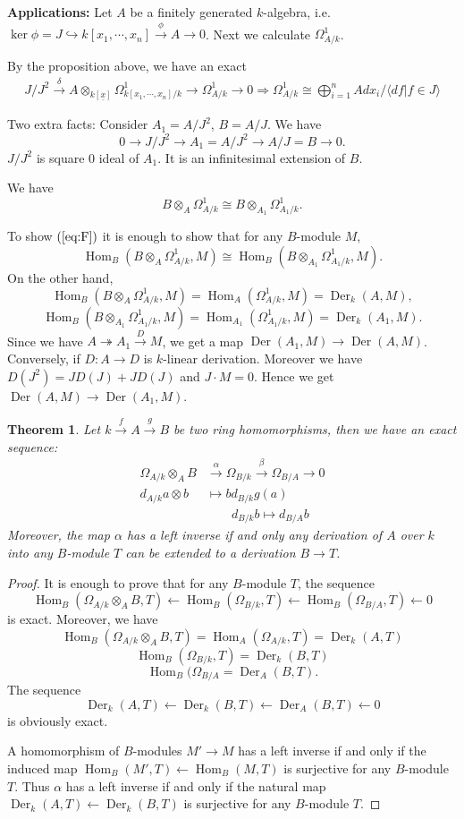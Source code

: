 \documentclass[cs4size]{article}
\newcommand{\la}{\leftarrow}
\newcommand{\ra}{\rightarrow}
\newcommand{\xr}{\xrightarrow}
\newcommand{\Ra}{\Rightarrow}
\DeclareMathOperator{\Der}{Der}
\DeclareMathOperator{\Hom}{Hom}
\newtheorem{thm}{Theorem}
\begin{document}
\textbf{Applications: } Let $A$ be a finitely generated $k$-algebra, i.e. $\ker{\phi}=J\hookrightarrow k[x_1,\cdots,x_n]\xr{\phi}A\ra 0$. Next we calculate $\Omega_{A/k}^1$.

By the proposition above, we have an exact
\begin{align*}
J/J^2\xr{\delta}A\otimes_{k[\underline{x}]}\Omega_{k[x_1,\cdots,x_n]/k}^1\ra\Omega_{A/k}^1\ra0
\Ra \Omega_{A/k}^1\cong \bigoplus_{i=1}^nAdx_i/\langle df|f\in J\rangle
\end{align*}

Two extra facts: Consider $A_1=A/J^2$, $B=A/J$. We have \[0\ra J/J^2\ra A_1=A/J^2\ra A/J=B\ra 0.\] $J/J^2$ is square $0$ ideal of $A_1$. It is an infinitesimal extension of $B$.

We have \begin{equation}
B\otimes _A\Omega_{A/k}^1\cong B\otimes_{A_1}\Omega_{A_1/k}^1.\label{eq:F}
\end{equation}

To show $(\ref{eq:F})$ it is enough to show that for any $B$-module $M$, \[\Hom_B(B\otimes_A\Omega_{A/k}^1,M)\cong \Hom_B(B\otimes_{A_1}\Omega_{A_1/k}^1,M).\] On the other hand, \[\Hom_B(B\otimes_A\Omega_{A/k}^1,M)=\Hom_A(\Omega_{A/k}^1,M)=\Der_k(A,M),\]
\[\Hom_B(B\otimes_{A_1}\Omega_{A_1/k}^1,M)=\Hom_{A_1}(\Omega_{A_1/k}^1,M)=\Der_k(A_1,M).\]
Since we have $A\twoheadrightarrow A_1\xr{D}M$, we get a map $\Der(A_1,M)\ra \Der(A,M)$. Conversely, if $D:A\ra D$ is $k$-linear derivation. Moreover we have $D(J^2)=JD(J)+JD(J)$ and $J\cdot M=0$. Hence we get $\Der(A,M)\ra\Der(A_1,M)$.

\begin{thm}
Let $k\xr{f} A\xr{g} B$ be two ring homomorphisms, then we have an exact sequence:
\begin{align*}
\Omega_{A/k}\otimes_AB&\xr{\alpha}\Omega_{B/k}\xr{\beta}\Omega_{B/A}\ra0\\
d_{A/k}a\otimes b&\mapsto bd_{B/k}g(a)\\
&\qquad d_{B/k}b\mapsto d_{B/A}b
\end{align*}
Moreover, the map $\alpha$ has a left inverse if and only any derivation of $A$ over $k$ into any $B$-module $T$ can be extended to a derivation $B\ra T$.
\end{thm}
\begin{proof}
It is enough to prove that for any $B$-module $T$, the sequence
\[\Hom_B(\Omega_{A/k}\otimes_AB,T)\la\Hom_B(\Omega_{B/k},T)\la\Hom_B(\Omega_{B/A},T)\la0\]
is exact.
Moreover, we have \[\Hom_B(\Omega_{A/k}\otimes_AB,T)=\Hom_A(\Omega_{A/k},T)=\Der_k(A,T)\]
\[\Hom_B(\Omega_{B/k},T)=\Der_k(B,T)\]
\[\Hom_B(\Omega_{B/A}=\Der_A(B,T).\]
The sequence
\[\Der_k(A,T)\la\Der_k(B,T)\la\Der_A(B,T)\la0\]
is obviously exact.

A homomorphism of $B$-modules $M'\ra M$ has a left inverse if and only if the induced map $\Hom_B(M',T)\la\Hom_B(M,T)$ is surjective for any $B$-module $T$. Thus $\alpha$ has a left inverse if and only if the natural map $\Der_k(A,T)\la\Der_k(B,T)$ is surjective for any $B$-module $T$.
\end{proof}
\end{document}

